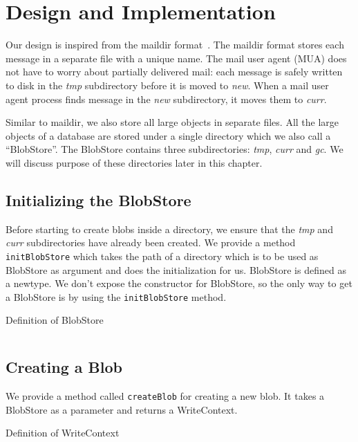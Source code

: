 \chapter{Design and Implementation}
\label{chap:design}

Our design is inspired from the maildir format~\cite{bernstein1995using}. The maildir format stores each message in a separate file with a unique name. The mail user agent (MUA) does not have to worry about partially delivered mail: each message is safely written to disk in the \textit{tmp} subdirectory before it is moved to \textit{new}. When a mail user agent process finds message in the \textit{new} subdirectory, it moves them to \textit{curr}.

Similar to maildir, we also store all large objects in separate files. All the large objects of a database are stored under a single directory which we also call a ``BlobStore''.
The BlobStore contains three subdirectories: \textit{tmp}, \textit{curr} and \textit{gc}. We will discuss purpose of these directories later in this chapter.

\section{Initializing the BlobStore}
Before starting to create blobs inside a directory, we ensure that the \textit{tmp} and \textit{curr} subdirectories have already been created. We provide a method \texttt{initBlobStore} which takes the path of a directory which is to be used as BlobStore as argument and does the initialization for us.
BlobStore is defined as a newtype. We don't expose the constructor for BlobStore, so the only way to get a BlobStore is by using the \texttt{initBlobStore} method.

\begin{program}
  \caption{Definition of BlobStore}
  \label{prog:defblobstore}
  \inputminted{haskell}{hs/blobstore.hs}
\end{program}

\section{Creating a Blob}
We provide a method called \texttt{createBlob} for creating a new blob. It takes a BlobStore as a parameter and returns a WriteContext.

\begin{program}
  \caption{Definition of WriteContext}
  \label{prog:defwritecontext}
  \inputminted{haskell}{hs/writecontext.hs}
\end{program}


